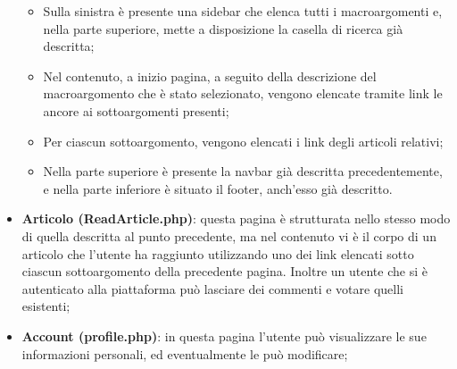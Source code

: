 \documentclass[12pt]{article}
\begin{document}
\begin{itemize}
				\begin{itemize}
					\item Sulla sinistra è presente una sidebar che elenca tutti i macroargomenti e, nella parte superiore, mette a disposizione la casella di ricerca già descritta;
					\item Nel contenuto, a inizio pagina, a seguito della descrizione del macroargomento che è stato selezionato, vengono elencate tramite link le ancore ai sottoargomenti presenti;
					\item Per ciascun sottoargomento, vengono elencati i link degli articoli relativi;
					\item Nella parte superiore è presente la navbar già descritta precedentemente, e nella parte inferiore è situato il footer, anch'esso già descritto.
				\end{itemize}
			\item \textbf{Articolo (ReadArticle.php)}: questa pagina è strutturata nello stesso modo di quella descritta al punto precedente, ma nel contenuto vi è il corpo di un articolo che l'utente ha raggiunto utilizzando uno dei link elencati sotto ciascun sottoargomento della precedente pagina. Inoltre un utente che si è autenticato alla piattaforma può lasciare dei commenti e votare quelli esistenti;
			\item \textbf{Account (profile.php)}: in questa pagina l'utente può visualizzare le sue informazioni personali, ed eventualmente le può modificare;
		\end{itemize}
	
\end{document}
